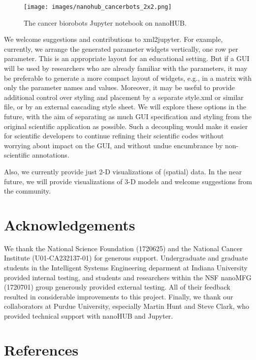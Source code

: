 \documentclass[10pt,letterpaper]{article}
\begin{document}
\begin{figure}
\centering
\texttt{[image: images/nanohub\_cancerbots\_2x2.png]}
\caption{The cancer biorobots Jupyter notebook on nanoHUB.}
\end{figure}

We welcome suggestions and contributions to xml2jupyter. For example,
currently, we arrange the generated parameter widgets vertically, one
row per parameter. This is an appropriate layout for an educational
setting. But if a GUI will be used by researchers who are already
familiar with the parameters, it may be preferable to generate a more
compact layout of widgets, e.g., in a matrix with only the parameter
names and values. Moreover, it may be useful to provide additional
control over styling and placement by a separate style.xml or similar
file, or by an external cascading style sheet. We will explore these
options in the future, with the aim of separating as much GUI
specification and styling from the original scientific application as
possible. Such a decoupling would make it easier for scientific
developers to continue refining their scientific codes without worrying
about impact on the GUI, and without undue encumbrance by non-scientific
annotations.

Also, we currently provide just 2-D visualizations of (spatial) data. In
the near future, we will provide visualizations of 3-D models and
welcome suggestions from the community.

\section*{Acknowledgements}

We thank the National Science Foundation (1720625) and the National
Cancer Institute (U01-CA232137-01) for generous support. Undergraduate
and graduate students in the Intelligent Systems Engineering deparment
at Indiana University provided internal testing, and students and
researchers within the NSF nanoMFG (1720701) group generously provided
external testing. All of their feedback resulted in considerable
improvements to this project. Finally, we thank our collaborators at
Purdue University, especially Martin Hunt and Steve Clark, who provided
technical support with nanoHUB and Jupyter.

\hypertarget{references}{%
\section*{References}\label{references}}
\end{document}
